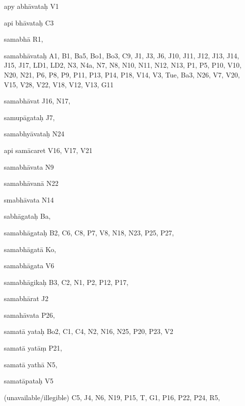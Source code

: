 \begin{ekdosis}
\begin{marma}[hp01_055]
\begin{marma}[hp02_009]
\begin{marma}[hp02_011]
\begin{marma}[hp02_021]
\begin{description}
    \end{description}
 \end{marma}


 \begin{marma}[hp02_021d]
\item[apy abhāvataḥ] V1
\item[api bhāvataḥ] C3
\item[samabhā] R1,
\item[samabhāvataḥ] A1, B1, Ba5, Bo1, Bo3, C9, J1, J3, J6, J10, J11, J12, J13, J14, J15, J17, LD1, LD2, N3, N4a, N7, N8, N10, N11, N12, N13, P1, P5, P10, V10, N20, N21, P6, P8, P9, P11, P13, P14, P18, V14, V3, Tue, Ba3, N26, V7, V20, V15, V28, V22, V18, V12, V13, G11
\item[samabhāvat] J16, N17, 
\item[samupāgataḥ] J7,
\item[samabhyāvataḥ] N24
\item[api samācaret] V16, V17, V21
\item[samabhāvata]  N9	
\item[samabhāvanā] N22
\item[smabhāvata]  N14
\item[sabhāgataḥ] Ba,
\item[samabhāgataḥ] B2, C6, C8, P7, V8, N18, N23, P25, P27, 
\item[samabhāgatā] Ko,
\item[samabhāgata] V6
\item[samabhāgikaḥ] B3, C2, N1, P2, P12, P17, 
\item[samabhārat] J2
\item[samahāvata]  P26, 
\item[samatā yataḥ]  Bo2, C1, C4, N2, N16, N25, P20, P23, V2
\item[samatā yatāṃ]  P21, 
\item[samatā yathā]   N5,
\item[samatāpataḥ] V5
\item[(unavailable/illegible)] C5, J4, N6, N19, P15, T, G1, P16, P22, P24, R5,
  \begin{description}

    \end{description}
 \end{marma}


 \begin{marma}[hp02_022a-c]
\sthana{}
  \begin{description}
    \end{description}
 \end{marma}



\end{marma}
\end{marma}
\end{marma}
\end{ekdosis}
